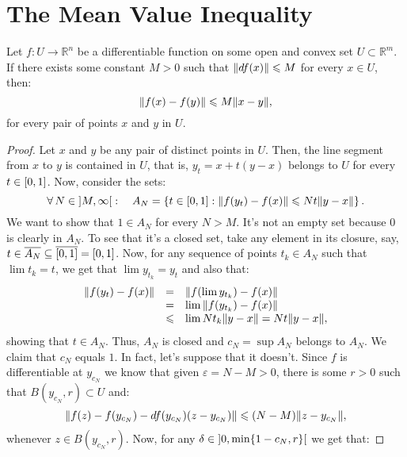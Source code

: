 \section{The Mean Value Inequality}\label{sec:the_mean_value_inequality}

\begin{theorem}\label{thm:the-mean-value-inequality}
	Let \(f:{U}\to{\mathbb{R}^{n}}\) be a differentiable function on some open and
	convex set \({U}\subset{\mathbb{R}^{m}}\). If there exists some constant
	\(M>0\) such that \(\lVert df(x)\rVert\leqslant{M}\) for every \({x}\in{U}\), then:
	\[
		{\lVert f(x)-f(y)\rVert}\leqslant{M\lVert x-y\rVert},
	\]
	for every pair of points \(x\) and \(y\) in \(U\).
\end{theorem}

\begin{proof}
	Let \(x\) and \(y\) be any pair of distinct points in \(U\). Then, the line
	segment from \(x\) to \(y\) is contained in \(U\), that is,
	\(y_{t}=x+t(y-x)\) belongs to \(U\) for every \({t}\in{\interval{0}{1}}\).
	Now, consider the sets:
	\[
		\forall\,{N}\in{\ointerval{M}{\infty}}:\quad
		A_{N}
		=
		\left\{
		{t}\in{\interval{0}{1}}
		:
		{\norm{f(y_{t})-f(x)}}\leqslant{Nt\norm{y-x}}
		\right\}
		.
	\]
	We want to show that \({1}\in{A_{N}}\) for every \(N>M\). It's not an empty
	set because \(0\) is clearly in \(A_{N}\). To see that it's a closed set, take
	any element in its closure, say,
	\({t}\in{\overline{A_{N}}}\subseteq{\overline{\interval{0}{1}}}=\interval{0}{1}\).
	Now, for any sequence of points \({t_{k}}\in{A_{N}}\) such that
	\(\lim{t_{k}}=t\), we get that \(\lim{y_{t_{k}}}=y_{t}\) and also that:
	\[
		\begin{array}{rcl}
			\lVert f(y_{t})-f(x)\rVert
			 & =         &
			\lVert f(\lim{y_{t_{k}}})-f(x)\rVert
			\\
			 & =         &
			\lim{\lVert f(y_{t_{k}})-f(x)\rVert}
			\\
			 & \leqslant &
			\lim{Nt_{k}\lVert y-x\rVert}=Nt\lVert y-x\rVert,
		\end{array}
	\]
	showing that \({t}\in{A_{N}}\). Thus, \(A_{N}\) is closed and
	\(c_{N}=\sup{A_{N}}\) belongs to \(A_{N}\). We claim that \(c_{N}\) equals
	\(1\). In fact, let's suppose that it doesn't. Since \(f\) is differentiable
	at \(y_{c_{N}}\) we know that given \(\varepsilon=N-M>0\), there is some
	\(r>0\) such that \({B(y_{c_{N}},r)}\subset{U}\) and:
	\[
		\lVert f(z)-f(y_{c_{N}})-df(y_{c_{N}})(z-y_{c_{N}})\rVert
		\leqslant
		(N-M)\lVert z-y_{c_{N}}\rVert,
	\]
	whenever \({z}\in{B(y_{c_{N}},r)}\). Now, for any
	\({\delta}\in{\ointerval{0}{\min\{1-c_{N},r\}}}\) we get that:

\end{proof}
